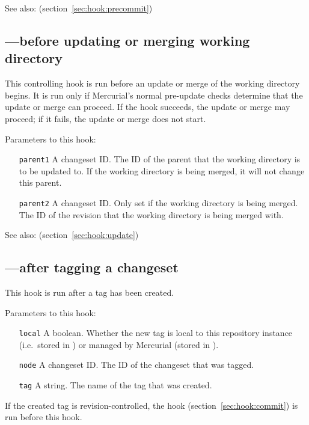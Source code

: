 See also:  (section~\ref{sec:hook:precommit})

\subsection{---before updating or merging working directory}
\label{sec:hook:preupdate}

This controlling hook is run before an update or merge of the working
directory begins.  It is run only if Mercurial's normal pre-update
checks determine that the update or merge can proceed.  If the hook
succeeds, the update or merge may proceed; if it fails, the update or
merge does not start.

Parameters to this hook:
\begin{itemize}
\item[\texttt{parent1}] A changeset ID.  The ID of the parent that the
  working directory is to be updated to.  If the working directory is
  being merged, it will not change this parent.
\item[\texttt{parent2}] A changeset ID.  Only set if the working
  directory is being merged.  The ID of the revision that the working
  directory is being merged with.
\end{itemize}

See also:  (section~\ref{sec:hook:update})

\subsection{---after tagging a changeset}
\label{sec:hook:tag}

This hook is run after a tag has been created.

Parameters to this hook:
\begin{itemize}
\item[\texttt{local}] A boolean.  Whether the new tag is local to this
  repository instance (i.e.~stored in ) or managed
  by Mercurial (stored in ).
\item[\texttt{node}] A changeset ID.  The ID of the changeset that was
  tagged.
\item[\texttt{tag}] A string.  The name of the tag that was created.
\end{itemize}

If the created tag is revision-controlled, the  hook
(section~\ref{sec:hook:commit}) is run before this hook.

